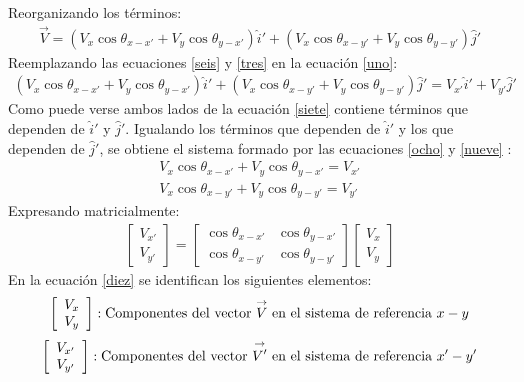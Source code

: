 \documentclass[12pt,letterpaper]{article}
\begin{document}
Reorganizando los términos:
%
\begin{align}
	\overset{\rightarrow}{V} = \left( V_x \cos \theta_{x-x'} + V_y \cos \theta_{y-x'} \right) \hat{i}'+ \left( V_x \cos \theta_{x-y'} + V_y \cos \theta_{y-y'} \right) \hat{j}' \label{seis}
\end{align}
%
Reemplazando las ecuaciones \ref{seis} y \ref{tres} en la ecuación \ref{uno}:
%
\begin{align}
	\left( V_x \cos \theta_{x-x'} + V_y \cos \theta_{y-x'} \right) \hat{i}'+ \left( V_x \cos \theta_{x-y'} + V_y \cos \theta_{y-y'} \right) \hat{j}' = V_{x'} \hat{i}' + V_{y'} \hat{j}' \label{siete}
\end{align}
%
Como puede verse ambos lados de la ecuación \ref{siete} contiene términos que dependen de $\hat{i}'$
y $\hat{j}'$. Igualando los términos que dependen de $\hat{i}'$ y los que dependen de $\hat{j}'$, se obtiene el sistema formado por las ecuaciones \ref{ocho} y \ref{nueve} :
%
\begin{align}
	V_x \cos \theta_{x-x'} + V_y \cos \theta_{y-x'} = V_{x'} \label{ocho}\\
	V_x \cos \theta_{x-y'} + V_y \cos \theta_{y-y'} = V_{y'} \label{nueve}
\end{align}
%
Expresando matricialmente: 
%
\begin{eqnarray}
		\left[ \begin{array}{c} V_{x'} \\
		V_{y'} \end{array} \right] = 
		\left[ \begin{array}{cc}
		\cos \theta_{x-x'} & \cos \theta_{y-x'} \\  
		\cos \theta_{x-y'} & \cos \theta_{y-y'}
		\end{array}  \right] 
		\left[ \begin{array}{c} V_{x} \\
		V_{y} \end{array} \right]
		\label{diez}
\end{eqnarray}
%
En la ecuación \ref{diez} se identifican los siguientes elementos:
%
\begin{align*}
	\left[ \begin{array}{c}
		V_x \\
		V_y	
	\end{array} \right]: \textup{Componentes del vector $\overset{\rightarrow}{V}$ en el sistema de referencia $x-y$} 
\end{align*}
%
\begin{align*}
	\left[ \begin{array}{c}
		V_{x'} \\
		V_{y'}	
	\end{array} \right]: \textup{Componentes del vector $\overset{\rightarrow}{V'}$ en el sistema de referencia $x'-y'$} 
\end{align*}
\end{document}
